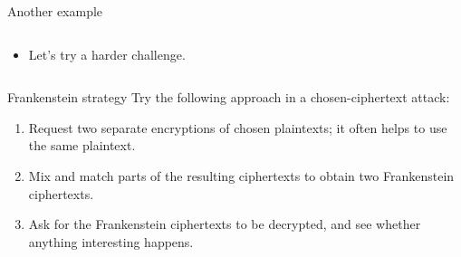 \documentclass[aspectratio=169, lualatex, handout]{beamer}
\begin{document}
\begin{frame}{Another example}
	\begin{columns}[c]
		\begin{column}{0.3\textwidth}
			\begin{itemize}
				\item Let's try a harder challenge.
			\end{itemize}
		\end{column}
		\begin{column}{0.7\textwidth}
		\end{column}
	\end{columns}
\end{frame}

\begin{frame}{Frankenstein strategy}
	Try the following approach in a chosen-ciphertext attack:
	\begin{enumerate}
		\item Request two separate encryptions of chosen plaintexts; it often helps to use the same plaintext.
		\item Mix and match parts of the resulting ciphertexts to obtain two Frankenstein ciphertexts.
		\item Ask for the Frankenstein ciphertexts to be decrypted, and see whether anything interesting happens.
	\end{enumerate}
\end{frame}
\end{document}

